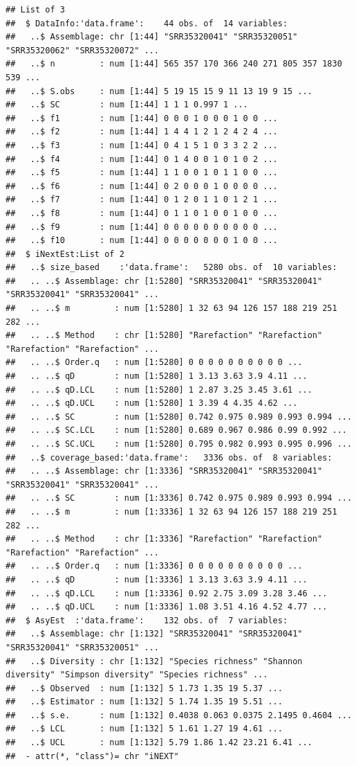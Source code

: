 \documentclass[
]{article}
\begin{document}
\begin{verbatim}
## List of 3
##  $ DataInfo:'data.frame':    44 obs. of  14 variables:
##   ..$ Assemblage: chr [1:44] "SRR35320041" "SRR35320051" "SRR35320062" "SRR35320072" ...
##   ..$ n         : num [1:44] 565 357 170 366 240 271 805 357 1830 539 ...
##   ..$ S.obs     : num [1:44] 5 19 15 15 9 11 13 19 9 15 ...
##   ..$ SC        : num [1:44] 1 1 1 0.997 1 ...
##   ..$ f1        : num [1:44] 0 0 0 1 0 0 0 1 0 0 ...
##   ..$ f2        : num [1:44] 1 4 4 1 2 1 2 4 2 4 ...
##   ..$ f3        : num [1:44] 0 4 1 5 1 0 3 3 2 2 ...
##   ..$ f4        : num [1:44] 0 1 4 0 0 1 0 1 0 2 ...
##   ..$ f5        : num [1:44] 1 1 0 0 1 0 1 1 0 0 ...
##   ..$ f6        : num [1:44] 0 2 0 0 0 1 0 0 0 0 ...
##   ..$ f7        : num [1:44] 0 1 2 0 1 1 0 1 2 1 ...
##   ..$ f8        : num [1:44] 0 1 1 0 1 0 0 1 0 0 ...
##   ..$ f9        : num [1:44] 0 0 0 0 0 0 0 0 0 0 ...
##   ..$ f10       : num [1:44] 0 0 0 0 0 0 0 1 0 0 ...
##  $ iNextEst:List of 2
##   ..$ size_based    :'data.frame':   5280 obs. of  10 variables:
##   .. ..$ Assemblage: chr [1:5280] "SRR35320041" "SRR35320041" "SRR35320041" "SRR35320041" ...
##   .. ..$ m         : num [1:5280] 1 32 63 94 126 157 188 219 251 282 ...
##   .. ..$ Method    : chr [1:5280] "Rarefaction" "Rarefaction" "Rarefaction" "Rarefaction" ...
##   .. ..$ Order.q   : num [1:5280] 0 0 0 0 0 0 0 0 0 0 ...
##   .. ..$ qD        : num [1:5280] 1 3.13 3.63 3.9 4.11 ...
##   .. ..$ qD.LCL    : num [1:5280] 1 2.87 3.25 3.45 3.61 ...
##   .. ..$ qD.UCL    : num [1:5280] 1 3.39 4 4.35 4.62 ...
##   .. ..$ SC        : num [1:5280] 0.742 0.975 0.989 0.993 0.994 ...
##   .. ..$ SC.LCL    : num [1:5280] 0.689 0.967 0.986 0.99 0.992 ...
##   .. ..$ SC.UCL    : num [1:5280] 0.795 0.982 0.993 0.995 0.996 ...
##   ..$ coverage_based:'data.frame':   3336 obs. of  8 variables:
##   .. ..$ Assemblage: chr [1:3336] "SRR35320041" "SRR35320041" "SRR35320041" "SRR35320041" ...
##   .. ..$ SC        : num [1:3336] 0.742 0.975 0.989 0.993 0.994 ...
##   .. ..$ m         : num [1:3336] 1 32 63 94 126 157 188 219 251 282 ...
##   .. ..$ Method    : chr [1:3336] "Rarefaction" "Rarefaction" "Rarefaction" "Rarefaction" ...
##   .. ..$ Order.q   : num [1:3336] 0 0 0 0 0 0 0 0 0 0 ...
##   .. ..$ qD        : num [1:3336] 1 3.13 3.63 3.9 4.11 ...
##   .. ..$ qD.LCL    : num [1:3336] 0.92 2.75 3.09 3.28 3.46 ...
##   .. ..$ qD.UCL    : num [1:3336] 1.08 3.51 4.16 4.52 4.77 ...
##  $ AsyEst  :'data.frame':    132 obs. of  7 variables:
##   ..$ Assemblage: chr [1:132] "SRR35320041" "SRR35320041" "SRR35320041" "SRR35320051" ...
##   ..$ Diversity : chr [1:132] "Species richness" "Shannon diversity" "Simpson diversity" "Species richness" ...
##   ..$ Observed  : num [1:132] 5 1.73 1.35 19 5.37 ...
##   ..$ Estimator : num [1:132] 5 1.74 1.35 19 5.51 ...
##   ..$ s.e.      : num [1:132] 0.4038 0.063 0.0375 2.1495 0.4604 ...
##   ..$ LCL       : num [1:132] 5 1.61 1.27 19 4.61 ...
##   ..$ UCL       : num [1:132] 5.79 1.86 1.42 23.21 6.41 ...
##  - attr(*, "class")= chr "iNEXT"
\end{verbatim}
\end{document}
